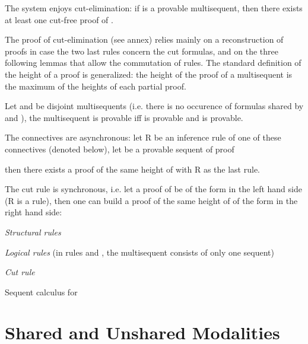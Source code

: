 \documentclass{llncs}
\begin{document}
\begin{proposition}
The system enjoys cut-elimination: if  is a provable multisequent, 
then there exists at least one cut-free proof of .
\end{proposition}

The proof of cut-elimination (see annex) relies mainly on a reconstruction of proofs in case the two last rules concern the cut formulas, and on the three following lemmas that allow the commutation of rules. The standard definition of the height of a proof is generalized: the height of the proof of a multisequent is the
maximum of the heights of each partial proof.

 
\begin{lemma}[Separability]
Let  and  be disjoint multisequents (i.e. there is no occurence of formulas shared by  and ), the multisequent  is provable iff  is provable and  is provable. 
\end{lemma}

\begin{lemma}[Asynchrony]\label{lemma:asynchrony}
The connectives  are asynchronous: let R be an 
inference rule of one of these connectives (denoted  below), let 
 be a provable sequent of proof

then there exists a proof of the same height of  with R as the last rule.
\end{lemma}

\begin{lemma}
The cut rule is synchronous, i.e. let a proof of  be of the form in the left hand side (R is a rule), then one can build a proof of the same height of  of the form in the right hand side:
\vspace{-.2cm}

\end{lemma}



\begin{Fig.}
{\em Structural rules}


{\em Logical rules} (in rules  and , the multisequent consists of only one sequent)


{\em Cut rule}

\caption{Sequent calculus for \CMALL}
\label{fig:seq-imp}
\end{Fig.}
 
\section{Shared and Unshared Modalities}\label{sec:modalities}
\end{document}
